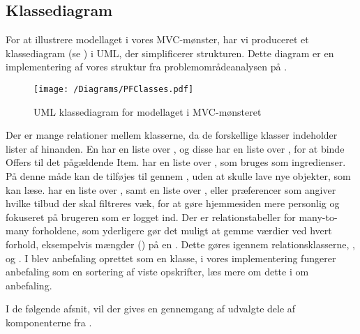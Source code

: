 \subsection{Klassediagram}
For at illustrere modellaget i vores MVC-mønster, har vi produceret et klassediagram (se ) i UML, der simplificerer strukturen. 
Dette diagram er en implementering af vores struktur fra problemområdeanalysen på .

\begin{figure}[h]
\centering
 \texttt{[image: /Diagrams/PFClasses.pdf]}
\caption{UML klassediagram for modellaget i MVC-mønsteret}\label{diagram:klassediagram}
\end{figure}

Der er mange relationer mellem klasserne, da de forskellige klasser indeholder lister af hinanden.
En  har en liste over , og disse  har en liste over , for at binde Offers til det pågældende Item.
 har en liste over , som bruges som ingredienser.
På denne måde kan de tilføjes til  gennem , uden at skulle lave nye objekter, som  kan læse.
 har en liste over , samt en liste over , eller præferencer som angiver hvilke tilbud der skal filtreres væk, for at gøre hjemmesiden mere personlig og fokuseret på brugeren som er logget ind.
Der er relationstabeller for many-to-many forholdene, som yderligere gør det muligt at gemme værdier ved hvert forhold, eksempelvis mængder () på en .
Dette gøres igennem relationsklasserne, , og .
I  blev anbefaling oprettet som en klasse, i vores implementering fungerer anbefaling som en sortering af viste opskrifter, læs mere om dette i  om anbefaling.

I de følgende afsnit, vil der gives en gennemgang af udvalgte dele af komponenterne fra .
